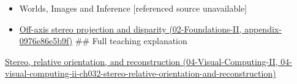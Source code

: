 \begin{itemize}
\item
  {Worlds, Images and Inference {[}referenced source unavailable{]}}
\item
  \href{../02-Foundations-II/main.pdf\#nameddest=appendix-0976e86e5b9f}{Off-axis stereo projection and disparity (02-Foundations-II, appendix-0976e86e5b9f)} \#\# Full teaching explanation
\end{itemize}

\href{../04-Visual-Computing-II/main.pdf\#nameddest=04-visual-computing-ii-ch032-stereo-relative-orientation-and-reconstruction}{Stereo, relative orientation, and reconstruction (04-Visual-Computing-II, 04-visual-computing-ii-ch032-stereo-relative-orientation-and-reconstruction)}
